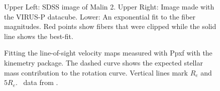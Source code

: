 \documentclass[12pt,preprint]{aastex}
\newcommand\HI{\ion{H}{1}}
\begin{document}
%
%





\begin{figure}
\caption{Upper Left:  SDSS image of Malin 2.  Upper Right:  Image made with the VIRUS-P datacube.  Lower:  An exponential fit to the fiber magnitudes.  Red points show fibers that were clipped while the solid line shows the best-fit.  \label{Malin2_fibers} }
\end{figure}











\begin{figure}
\caption{Fitting the line-of-sight velocity maps measured with Ppxf with the kinemetry package.  The dashed curve shows the expected stellar mass contribution to the rotation curve.  Vertical lines mark $R_e$ and $5R_e$.  \HI\ data from \citet{Pickering97}.  \label{malin_kinem}}
\end{figure}


\end{document}
